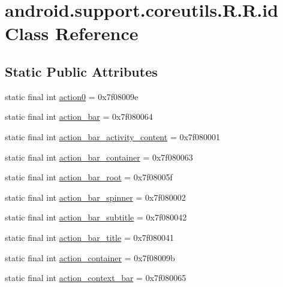 \hypertarget{classandroid_1_1support_1_1coreutils_1_1_r_1_1id}{
\section{android.support.coreutils.R.R.id Class Reference}
\label{classandroid_1_1support_1_1coreutils_1_1_r_1_1id}
}
\subsection*{Static Public Attributes}
\begin{CompactItemize}
\item 
static final int \hyperlink{classandroid_1_1support_1_1coreutils_1_1_r_1_1id_80e58cffb00744c5f2fdcbf9d0ae4b46}{action0} = 0x7f08009e
\item 
static final int \hyperlink{classandroid_1_1support_1_1coreutils_1_1_r_1_1id_2380f81edba4a28a034b7d2cee17829b}{action\_\-bar} = 0x7f080064
\item 
static final int \hyperlink{classandroid_1_1support_1_1coreutils_1_1_r_1_1id_7af936b8614e04780230ea264adedb24}{action\_\-bar\_\-activity\_\-content} = 0x7f080001
\item 
static final int \hyperlink{classandroid_1_1support_1_1coreutils_1_1_r_1_1id_42e29ad55e5659b2f6ad65ab5d6559d1}{action\_\-bar\_\-container} = 0x7f080063
\item 
static final int \hyperlink{classandroid_1_1support_1_1coreutils_1_1_r_1_1id_cdc29d37a9c51fc091d16ff5f6479008}{action\_\-bar\_\-root} = 0x7f08005f
\item 
static final int \hyperlink{classandroid_1_1support_1_1coreutils_1_1_r_1_1id_60a65bf2ae5af3a6606534a326b6e6b5}{action\_\-bar\_\-spinner} = 0x7f080002
\item 
static final int \hyperlink{classandroid_1_1support_1_1coreutils_1_1_r_1_1id_a6c22aa47786dd279fb456f3da99f439}{action\_\-bar\_\-subtitle} = 0x7f080042
\item 
static final int \hyperlink{classandroid_1_1support_1_1coreutils_1_1_r_1_1id_a3b3954ed6c0d48f73a891bf449455f9}{action\_\-bar\_\-title} = 0x7f080041
\item 
static final int \hyperlink{classandroid_1_1support_1_1coreutils_1_1_r_1_1id_4d142a6b08f0438c569d0c247439486f}{action\_\-container} = 0x7f08009b
\item 
static final int \hyperlink{classandroid_1_1support_1_1coreutils_1_1_r_1_1id_846247fbe75a254504f2479e2c5e0e43}{action\_\-context\_\-bar} = 0x7f080065

\end{CompactItemize}
